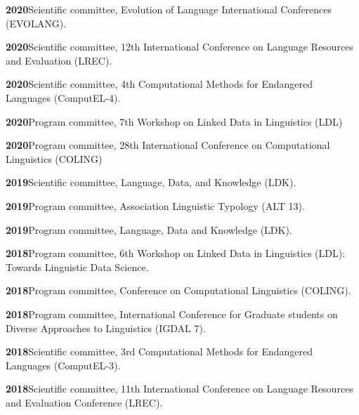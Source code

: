 \documentclass[11pt]{article}
\newcommand{\hangpara}{
 \setlength{\parindent}{0in} %
 \hangindent=0.42in %
}
\begin{document}
\vskip 6pt
\hangpara
{\bf 2020}\hspace{1ex}Scientific committee, Evolution of Language International Conferences (EVOLANG).

\vskip 6pt
\hangpara
{\bf 2020}\hspace{1ex}Scientific committee, 12th International Conference on Language Resources and Evaluation (LREC).

\vskip 6pt
\hangpara
{\bf 2020}\hspace{1ex}Scientific committee, 4th Computational Methods for Endangered Languages (ComputEL-4).

\vskip 6pt
\hangpara
{\bf 2020}\hspace{1ex}Program committee, 7th Workshop on Linked Data in Linguistics (LDL)

\vskip 6pt
\hangpara
{\bf 2020}\hspace{1ex}Program committee, 28th International Conference on Computational Linguistics (COLING)

\vskip 6pt
\hangpara
{\bf 2019}\hspace{1ex}Scientific committee, Language, Data, and Knowledge (LDK).

\vskip 6pt
\hangpara
{\bf 2019}\hspace{1ex}Program committee, Association Linguistic Typology (ALT 13).

\vskip 6pt
\hangpara
{\bf 2019}\hspace{1ex}Program committee, Language, Data and Knowledge (LDK).

\vskip 6pt
\hangpara
{\bf 2018}\hspace{1ex}Program committee, 6th Workshop on Linked Data in Linguistics (LDL): Towards Linguistic Data Science.

\vskip 6pt
\hangpara
{\bf 2018}\hspace{1ex}Program committee, Conference on Computational Linguistics (COLING).

\vskip 6pt
\hangpara
{\bf 2018}\hspace{1ex}Program committee, International Conference for Graduate students on Diverse Approaches to Linguistics (IGDAL 7).

\vskip 6pt
\hangpara
{\bf 2018}\hspace{1ex}Scientific committee, 3rd Computational Methods for Endangered Languages (ComputEL-3).

\vskip 6pt
\hangpara
{\bf 2018}\hspace{1ex}Scientific committee, 11th International Conference on Language Resources and Evaluation Conference (LREC).
\end{document}

